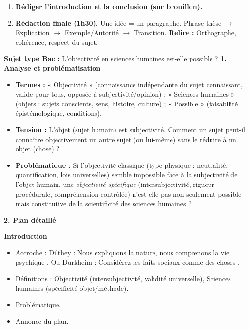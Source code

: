 \documentclass[11pt]{article}
\begin{document}
\begin{methode}
\begin{enumerate}
\begin{itemize}
        \end{itemize}
        \item \textbf{Rédiger l'introduction et la conclusion (sur brouillon).}
        \item \textbf{Rédaction finale (1h30).} Une idée = un paragraphe. Phrase thèse $\rightarrow$ Explication $\rightarrow$ Exemple/Autorité $\rightarrow$ Transition. \textbf{Relire :} Orthographe, cohérence, respect du sujet.
    \end{enumerate}
\end{methode}

\begin{exoresolu}
    \textbf{Sujet type Bac :} \guillemotleft L'objectivité en sciences humaines est-elle possible ? \guillemotright
    \tcblower
    \textbf{1. Analyse et problématisation}
    \begin{itemize}
        \item \textbf{Termes :} « Objectivité » (connaissance indépendante du sujet connaissant, valide pour tous, opposée à subjectivité/opinion) ; « Sciences humaines » (objets : sujets conscients, sens, histoire, culture) ; « Possible » (faisabilité épistémologique, conditions).
        \item \textbf{Tension :} L'objet (sujet humain) est subjectivité. Comment un sujet peut-il connaître objectivement un autre sujet (ou lui-même) sans le réduire à un objet (chose) ?
        \item \textbf{Problématique :} Si l'objectivité classique (type physique : neutralité, quantification, lois universelles) semble impossible face à la subjectivité de l'objet humain, une \emph{objectivité spécifique} (intersubjectivité, rigueur procédurale, compréhension contrôlée) n'est-elle pas non seulement possible mais constitutive de la scientificité des sciences humaines ?
    \end{itemize}

    \textbf{2. Plan détaillé}

    \textbf{Introduction}
    \begin{itemize}
        \item Accroche : Dilthey : \guillemotleft Nous expliquons la nature, nous comprenons la vie psychique \guillemotright. Ou Durkheim : \guillemotleft Considérez les faits sociaux comme des choses \guillemotright.
        \item Définitions : Objectivité (intersubjectivité, validité universelle), Sciences humaines (spécificité objet/méthode).
        \item Problématique.
        \item Annonce du plan.
    \end{itemize}


\end{exoresolu}
\end{document}
